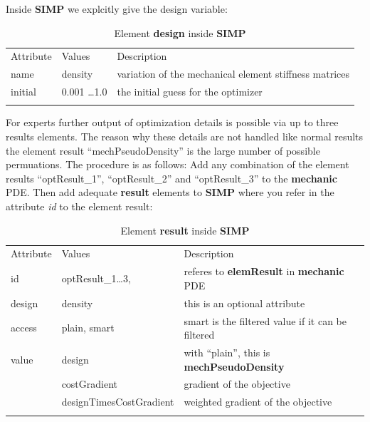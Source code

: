 Inside \textbf{SIMP} we explcitly give the design variable:

\begin{center}
\begin{longtable}{llp{}}
\hline\noalign{\smallskip}
Attribute & Values & Description \\
\noalign{\smallskip}\hline\noalign{\smallskip}
name     & density & variation of the mechanical element stiffness matrices \\
initial  & 0.001 \ldots 1.0 & the initial guess for the optimizer \\
\noalign{\smallskip}\hline\noalign{\smallskip}
\caption{Element \textbf{design} inside \textbf{SIMP}}
\end{longtable}
\end{center} 

For experts further output of optimization details is possible via
up to three results elements. The reason why these details are not handled
like normal results the element result ``mechPseudoDensity'' is the large number of 
possible permuations. The procedure is as follows: Add any combination
of the element results ``optResult\_1'', ``optResult\_2'' and ``optResult\_3'' to the 
\textbf{mechanic} PDE. Then add adequate \textbf{result} elements to \textbf{SIMP}
where you refer in the attribute \textsl{id} to the element result:

\begin{center}
\begin{longtable}{llp{}}
\hline\noalign{\smallskip}
Attribute & Values & Description \\
\noalign{\smallskip}\hline\noalign{\smallskip}
id     & optResult\_1\ldots3,  & referes to \textbf{elemResult} in \textbf{mechanic} PDE \\
design & density & this is an optional attribute \\
access & plain, smart & smart is the filtered value if it can be filtered \\
value & design & with ``plain'', this is \textbf{mechPseudoDensity} \\
      & costGradient & gradient of the objective \\
      & designTimesCostGradient &  weighted gradient of the objective \\
\noalign{\smallskip}\hline\noalign{\smallskip}
\caption{Element \textbf{result} inside \textbf{SIMP}}
\end{longtable}
\end{center} 


